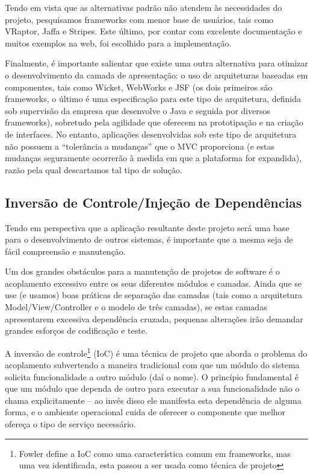 \documentclass{abnt}
\begin{document}
Tendo em vista que as alternativas padrão não atendem às necessidades do projeto, pesquisamos frameworks com menor base de usuários, tais como VRaptor, Jaffa e Stripes. Este último, por contar com excelente documentação e muitos exemplos na web, foi escolhido para a implementação.

Finalmente, é importante salientar que existe uma outra alternativa para otimizar o desenvolvimento da camada de apresentação: o uso de arquiteturas baseadas em componentes, tais como Wicket, WebWorks e JSF (os dois primeiros são frameworks, o último é uma especificação para este tipo de arquitetura, definida sob supervisão da empresa que desenvolve o Java e seguida por diversos frameworks), sobretudo pela agilidade que oferecem na prototipação e na criação de interfaces. No entanto, aplicações desenvolvidas sob este tipo de arquitetura não possuem a “tolerância a mudanças” que o MVC proporciona (e estas mudanças seguramente ocorrerão à medida em que a plataforma for expandida), razão pela qual descartamos tal tipo de solução.

	\subsection{Inversão de Controle/Injeção de Dependências}

Tendo em perspectiva que a aplicação resultante deste projeto será uma base para o desenvolvimento de outros sistemas, é importante que a mesma seja de fácil compreensão e manutenção.

	Um dos grandes obstáculos para a manutenção de projetos de software é o acoplamento excessivo entre os seus diferentes módulos e camadas. Ainda que se use (e usamos) boas práticas de separação das camadas (tais como a arquitetura Model/View/Controller e o modelo de três camadas), se estas camadas apresentarem excessiva dependência cruzada, pequenas alterações irão demandar grandes esforços de codificação e teste.

A inversão de controle\footnote{Fowler\cite{FowlerIoc} define a IoC como uma característica comum em frameworks, mas uma vez identificada, esta passou a ser usada como técnica de projeto } (IoC) é uma técnica de projeto que aborda o problema do acoplamento subvertendo a maneira tradicional com que um módulo do sistema solicita funcionalidade a outro módulo (daí o nome). O princípio fundamental é que um módulo que dependa de outro para executar a sua funcionalidade não o chama explicitamente – ao invés disso ele manifesta esta dependência de alguma forma, e o ambiente operacional cuida de oferecer o componente que melhor ofereça o tipo de serviço necessário.
\end{document}
